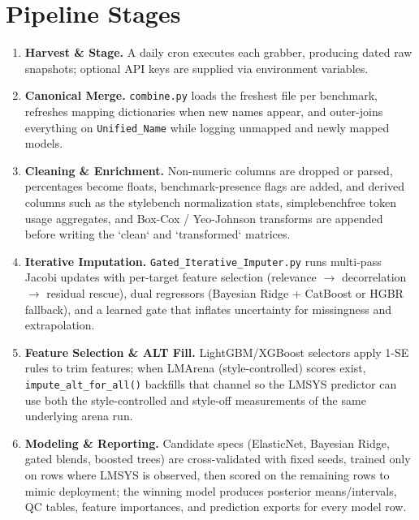 \documentclass[9pt,twocolumn]{extarticle}
\begin{document}
\section*{Pipeline Stages}
\begin{enumerate}
  \item \textbf{Harvest \& Stage.} A daily cron executes each grabber, producing dated raw snapshots; optional API keys are supplied via environment variables.
  \item \textbf{Canonical Merge.} \texttt{combine.py} loads the freshest file per benchmark, refreshes mapping dictionaries when new names appear, and outer-joins everything on \texttt{Unified\_Name} while logging unmapped and newly mapped models.
  \item \textbf{Cleaning \& Enrichment.} Non-numeric columns are dropped or parsed, percentages become floats, benchmark-presence flags are added, and derived columns such as the stylebench normalization stats, simplebenchfree token usage aggregates, and Box-Cox / Yeo-Johnson transforms are appended before writing the `clean` and `transformed` matrices.
  \item \textbf{Iterative Imputation.} \texttt{Gated\_Iterative\_Imputer.py} runs multi-pass Jacobi updates with per-target feature selection (relevance $\rightarrow$ decorrelation $\rightarrow$ residual rescue), dual regressors (Bayesian Ridge + CatBoost or HGBR fallback), and a learned gate that inflates uncertainty for missingness and extrapolation.
  \item \textbf{Feature Selection \& ALT Fill.} LightGBM/XGBoost selectors apply 1-SE rules to trim features; when LMArena (style-controlled) scores exist, \texttt{impute\_alt\_for\_all()} backfills that channel so the LMSYS predictor can use both the style-controlled and style-off measurements of the same underlying arena run.
  \item \textbf{Modeling \& Reporting.} Candidate specs (ElasticNet, Bayesian Ridge, gated blends, boosted trees) are cross-validated with fixed seeds, trained only on rows where LMSYS is observed, then scored on the remaining rows to mimic deployment; the winning model produces posterior means/intervals, QC tables, feature importances, and prediction exports for every model row.
\end{enumerate}
\end{document}
